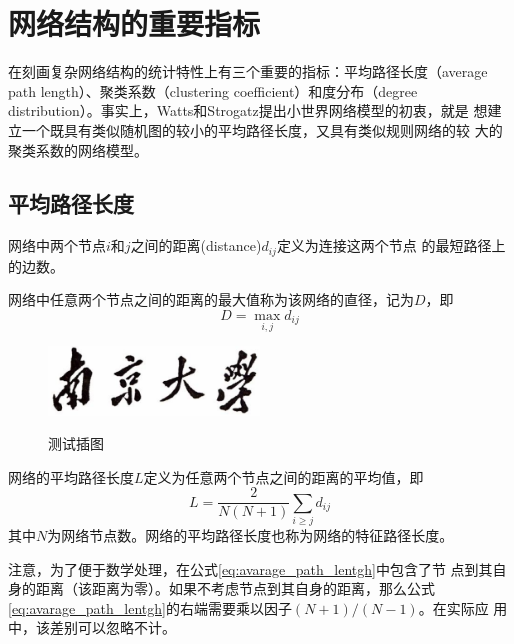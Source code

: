 \documentclass[master]{njuthesis}
\begin{document}
\section{网络结构的重要指标}

在刻画复杂网络结构的统计特性上有三个重要的指标：平均路径长度（average
  path length）、聚类系数（clustering coefficient）和度分布（degree
  distribution）。事实上，Watts和Strogatz提出小世界网络模型的初衷，就是
想建立一个既具有类似随机图的较小的平均路径长度，又具有类似规则网络的较
大的聚类系数的网络模型。

\subsection{平均路径长度}

\begin{definition}[节点之间的距离]
网络中两个节点$i$和$j$之间的距离(distance)$d_{ij}$定义为连接这两个节点
的最短路径上的边数。
\end{definition}

\begin{definition}[直径]
网络中任意两个节点之间的距离的最大值称为该网络的直径，记为$D$，即
\begin{equation}\label{eq:dimension}
    D = \max_{i,j} d_{ij}
\end{equation}
\end{definition}


\begin{figure}[htbp]
  \centering
  \includegraphics[width= 0.5\textwidth]{njuname.eps}\\
  \caption{测试插图}\label{fig:test3}
\end{figure}

\begin{definition}[平均路径长度]
网络的平均路径长度$L$定义为任意两个节点之间的距离的平均值，即
\begin{equation}\label{eq:avarage_path_lentgh}
    L = \frac{2}{N(N+1)}\sum_{i\geq j}d_{ij}
\end{equation}
其中$N$为网络节点数。网络的平均路径长度也称为网络的特征路径长度。
\end{definition}

注意，为了便于数学处理，在公式\eqref{eq:avarage_path_lentgh}中包含了节
点到其自身的距离（该距离为零）。如果不考虑节点到其自身的距离，那么公式
\eqref{eq:avarage_path_lentgh}的右端需要乘以因子$(N+1)/(N-1)$。在实际应
用中，该差别可以忽略不计。
\end{document}
